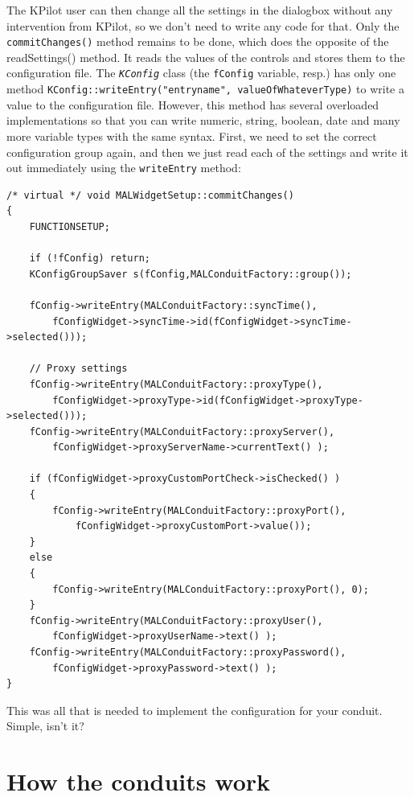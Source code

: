 \documentclass[10pt,a4paper]{article}
\newcommand{\code}[1]{{\small\texttt{#1}}}
\newcommand{\class}[1]{{\small\em\texttt{#1}}}
\begin{document}
The KPilot user can then change all the settings in the dialogbox without any intervention from KPilot, so we don't need to write any code for that. Only the \code{commitChanges()} method remains to be done, which does the opposite of the readSettings() method. It reads the values of the controls and stores them to the configuration file. The \class{KConfig} class (the \code{fConfig} variable, resp.) has only one method \code{KConfig::writeEntry("entryname", valueOfWhateverType)} to write a value to the configuration file. However, this method has several overloaded implementations so that you can write numeric, string, boolean, date and many more variable types with the same syntax. First, we need to set the correct configuration group again, and then we just read each of the settings and write it out immediately using the \code{writeEntry} method:

{\footnotesize\begin{verbatim}
/* virtual */ void MALWidgetSetup::commitChanges()
{
    FUNCTIONSETUP;

    if (!fConfig) return;
    KConfigGroupSaver s(fConfig,MALConduitFactory::group());
    
    fConfig->writeEntry(MALConduitFactory::syncTime(),
        fConfigWidget->syncTime->id(fConfigWidget->syncTime->selected()));
    
    // Proxy settings
    fConfig->writeEntry(MALConduitFactory::proxyType(),
        fConfigWidget->proxyType->id(fConfigWidget->proxyType->selected()));
    fConfig->writeEntry(MALConduitFactory::proxyServer(), 
        fConfigWidget->proxyServerName->currentText() );

    if (fConfigWidget->proxyCustomPortCheck->isChecked() ) 
    {
        fConfig->writeEntry(MALConduitFactory::proxyPort(), 
            fConfigWidget->proxyCustomPort->value());
    }
    else 
    {
        fConfig->writeEntry(MALConduitFactory::proxyPort(), 0);
    }
    fConfig->writeEntry(MALConduitFactory::proxyUser(), 
        fConfigWidget->proxyUserName->text() );
    fConfig->writeEntry(MALConduitFactory::proxyPassword(), 
        fConfigWidget->proxyPassword->text() );
}
\end{verbatim}
}

This was all that is needed to implement the configuration for your conduit. Simple, isn't it?



\section{How the conduits work}
\end{document}

